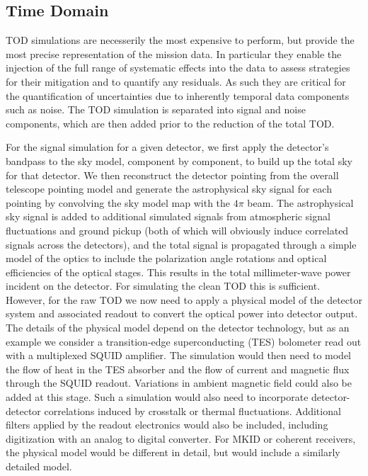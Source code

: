 \subsection{Time Domain}

TOD simulations are necesserily the most expensive to perform, but provide the most precise representation of the mission data. In particular they enable the injection of the full range of systematic effects into the data to assess strategies for their mitigation and to quantify any residuals. As such they are critical for the quantification of uncertainties due to inherently temporal data components such as noise. The TOD simulation is separated into signal and noise components, which are then added prior to the reduction of the total TOD.

For the signal simulation for a given detector, we first apply the detector's bandpass to the sky model, component by component, to build up the total sky for that detector. We then reconstruct the detector pointing from the overall telescope pointing model and generate the astrophysical sky signal for each pointing by convolving the sky model map with the $4 \pi$ beam. The astrophysical sky signal is added to additional simulated signals from atmospheric signal fluctuations and ground pickup (both of which will obviously induce correlated signals across the detectors), and the total signal is propagated through a simple model of the optics to include the polarization angle rotations and optical efficiencies of the optical stages. This results in the total millimeter-wave power incident on the detector. For simulating the clean TOD this is sufficient. However, for the raw TOD we now need to apply a physical model of the detector system and associated readout to convert the optical power into detector output. The details of the physical model depend on the detector technology, but as an example we consider a transition-edge superconducting (TES) bolometer read out with a multiplexed SQUID amplifier. The simulation would then need to model the flow of heat in the TES absorber and the flow of current and magnetic flux through the SQUID readout. Variations in ambient magnetic field could also be added at this stage. Such a simulation would also need to incorporate detector-detector correlations induced by crosstalk or thermal fluctuations.  Additional filters applied by the readout electronics would also be included, including digitization with an analog to digital converter. For MKID or coherent receivers, the physical model would be different in detail, but would include a similarly detailed model.

